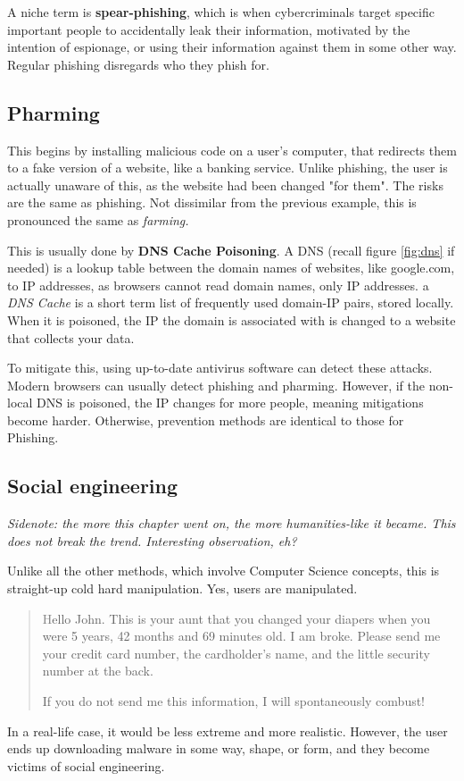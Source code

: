 \documentclass[../main.tex]{subfiles}
\begin{document}
A niche term is \textbf{spear-phishing}, which is when cybercriminals target specific important people to accidentally leak their information, motivated by the intention of espionage, or using their information against them in some other way. Regular phishing disregards who they phish for.

\subsection{Pharming}

This begins by installing malicious code on a user's computer, that redirects them to a fake version of a website, like a banking service. Unlike phishing, the user is actually unaware of this, as the website had been changed "for them". The risks are the same as phishing. Not dissimilar from the previous example, this is pronounced the same as \emph{farming.}

This is usually done by \textbf{DNS Cache Poisoning}. A DNS (recall figure \ref{fig:dns} if needed) is a lookup table between the domain names of websites, like {\ccmono google.com}, to IP addresses, as browsers cannot read domain names, only IP addresses. a \emph{DNS Cache} is a short term list of frequently used domain-IP pairs, stored locally. When it is poisoned, the IP the domain is associated with is changed to a website that collects your data.

To mitigate this, using up-to-date antivirus software can detect these attacks. Modern browsers can usually detect phishing and pharming. However, if the non-local DNS is poisoned, the IP changes for more people, meaning mitigations become harder. Otherwise, prevention methods are identical to those for Phishing.

\subsection{Social engineering}

\emph{Sidenote: the more this chapter went on, the more humanities-like it became. This does not break the trend. Interesting observation, eh?}

Unlike all the other methods, which involve Computer Science concepts, this is straight-up cold hard manipulation. Yes, users are manipulated.

\blockquote{\textcolor{gray}
Hello John. This is your aunt that you changed your diapers when you were 5 years, 42 months and 69 minutes old. I am broke. Please send me your credit card number, the cardholder's name, and the little security number at the back.

If you do not send me this information, I will spontaneously combust!
}

In a real-life case, it would be less extreme and more realistic. However, the user ends up downloading malware in some way, shape, or form, and they become victims of social engineering.
\end{document}
